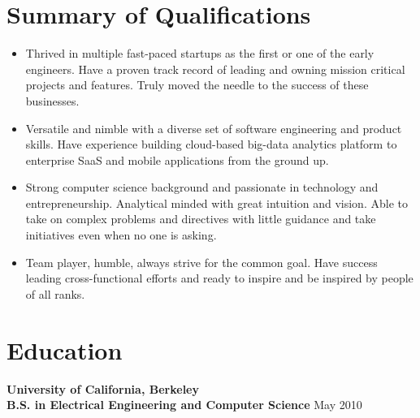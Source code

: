 \documentclass[margin,line]{res}
\newcommand{\sstyle}{\sc}
\begin{document}
\begin{resume}
  \section{\sstyle Summary of Qualifications}
  \begin{itemize}
  \item Thrived in multiple fast-paced startups as the first or one of the early
        engineers. Have a proven track record of leading and owning mission
        critical projects and features. Truly moved the needle to the success of
        these businesses.
  \item Versatile and nimble with a diverse set of software engineering and
        product skills. Have experience building cloud-based big-data analytics
        platform to enterprise SaaS and mobile applications from the ground up.
  \item Strong computer science background and passionate in technology and
        entrepreneurship. Analytical minded with great intuition and vision.
        Able to take on complex problems and directives with little guidance
        and take initiatives even when no one is asking.
  \item Team player, humble, always strive for the common goal. Have success
        leading cross-functional efforts and ready to inspire and be inspired by
        people of all ranks.
  \end{itemize}

  \section{\sstyle Education}
  {\bf University of California, Berkeley}\\
  {\bf B.S. in Electrical Engineering and Computer Science} \hfill May 2010


\end{resume}
\end{document}
